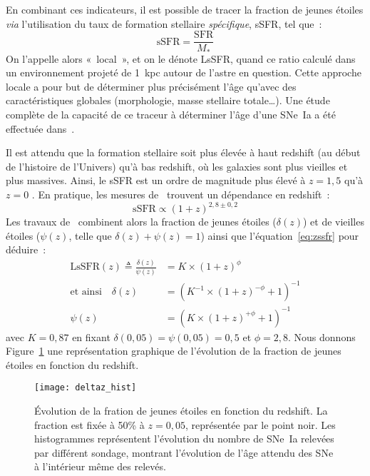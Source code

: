 \documentclass[../main/main.tex]{subfiles}
\begin{document}
En combinant ces indicateurs, il est possible de tracer la fraction de jeunes
étoiles \textit{via} l'utilisation du taux de formation stellaire
\textit{spécifique}, sSFR, tel que~:
\begin{equation}\label{eq:ssfr}
    \mathrm{sSFR} = \frac{\mathrm{SFR}}{M_*}
\end{equation}
On l'appelle alors «~local~», et on le dénote LsSFR, quand ce ratio calculé dans
un environnement projeté de \SI{1}{kpc} autour de l'astre en question. Cette
approche locale a pour but de déterminer plus précisément l'âge qu'avec des
caractéristiques globales (morphologie, masse stellaire totale…). Une étude
complète de la capacité de ce traceur à déterminer l'âge d'une SNe~Ia a été
effectuée dans~\cite{briday2021, briday2022}.

Il est attendu que la formation stellaire soit plus élevée à haut redshift (au
début de l'histoire de l'Univers) qu'à bas redshift, où les galaxies sont plus
vieilles et plus massives. Ainsi, le sSFR est un ordre de magnitude plus élevé à
$z = 1,5$ qu'à $z = 0$ \citep[voir][pour une étude complète]{madau2015}. En
pratique, les mesures de~\cite{tasca2015} trouvent un dépendance en redshift~:
\begin{equation}\label{eq:zssfr}
    \mathrm{sSFR} \propto (1+z)^{2,8 \pm 0,2}
\end{equation}
Les travaux de~\cite{rigault2020} combinent alors la fraction de jeunes étoiles
($\delta(z)$) et de vieilles étoiles ($\psi(z)$, telle que $\delta(z) + \psi(z)
= 1$) ainsi que l'équation~\ref{eq:zssfr} pour déduire~:
\begin{align}\label{eq:dpz}
    \mathrm{LsSFR}(z) \triangleq \frac{\delta(z)}{\psi(z)} &=
    K\times(1+z)^{\phi} \\\label{eq:deltaz}
    \text{et ainsi}\quad
    \delta(z) & = \left( K^{-1}\times(1+z)^{-\phi} +1 \right)^{-1}
    \\\label{eq:psiz}
    \psi(z)   & = \left( K\times(1+z)^{+\phi} +1 \right)^{-1}
\end{align}
avec $K=0,87$ en fixant $\delta(0,05) = \psi(0,05) = 0,5$ et $\phi = 2,8$. Nous
donnons Figure~\ref{fig:deltaz} une représentation graphique de l'évolution de
la fraction de jeunes étoiles en fonction du redshift.

\begin{figure}[ht]
    \centering
    \texttt{[image: deltaz\_hist]}
    \caption[Évolution de la fration de jeunes étoiles en fonction du
    redshift]{Évolution de la fration de jeunes étoiles en fonction du redshift.
    La fraction est fixée à 50\% à $z=0,05$, représentée par le point noir. Les
histogrammes représentent l'évolution du nombre de SNe~Ia relevées par différent
sondage, montrant l'évolution de l'âge attendu des SNe à l'intérieur même des
relevés.}
    \label{fig:deltaz}
\end{figure}
\end{document}
